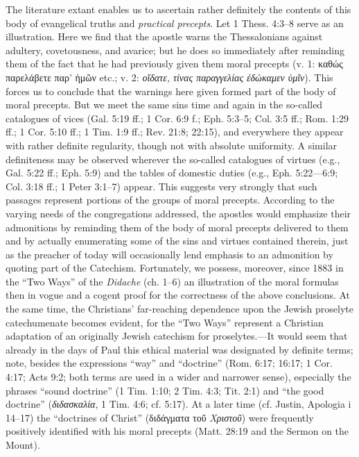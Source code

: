 The literature extant enables us to ascertain rather definitely the contents of this body of evangelical truths and \emph{practical precepts}. Let 1 Thess. 4:3–8 serve as an illustration. Here we find that the apostle warns the Thessalonians against adultery, covetousness, and avarice; but he does so immediately after reminding them of the fact that he had previously given them moral precepts (v. 1: καθώς παρελάβετε παρ’ ἡμῶν etc.;
v. 2: \emph{οἴδατε, τίνας παραγγελίας ἐδώκαμεν ὑμῖν}). This forces us to conclude that the warnings here given formed part of the body of moral precepts. But we meet the same sins time and again in the so-called catalogues of vices (Gal. 5:19 ff.; 1 Cor. 6:9 f.; Eph. 5:3–5; Col. 3:5 ff.; Rom. 1:29 ff.; 1 Cor. 5:10 ff.; 1 Tim. 1:9 ff.; Rev. 21:8; 22:15), and everywhere they appear with rather definite regularity, though not with absolute uniformity. A similar definiteness may be observed wherever the so-called catalogues of virtues (e.g., Gal. 5:22 ff.; Eph. 5:9) and the tables of domestic duties (e.g., Eph. 5:22—6:9; Col. 3:18 ff.; 1 Peter 3:1–7) appear. This suggests very strongly that such passages represent portions of the groups of moral precepts. According to the varying needs of the congregations addressed, the apostles would emphasize their admonitions by reminding them of the body of moral precepts delivered to them and by actually enumerating some of the sins and virtues contained therein, just as the preacher of today will occasionally lend emphasis to an admonition by quoting part of the Catechism. Fortunately, we possess, moreover, since 1883 in the “Two Ways” of the \emph{Didache} (ch. 1–6) an illustration of the moral formulas then in vogue and a cogent proof for the correctness of the above conclusions. At the same time, the Christians’ far-reaching dependence upon the Jewish proselyte catechumenate becomes evident, for the “Two Ways” represent a Christian adaptation of an originally Jewish catechism for proselytes.—It would seem that already in the days of Paul this ethical material was designated by definite terms; note, besides the expressions “way” and “doctrine” (Rom. 6:17; 16:17; 1 Cor. 4:17; Acts 9:2; both terms are used in a wider and narrower sense), especially the phrases “sound doctrine” (1 Tim. 1:10; 2 Tim. 4:3; Tit. 2:1) and “the good doctrine” (\emph{διδασκαλία}, 1 Tim. 4:6; cf. 5:17). At a later time (cf. Justin, Apologia i 14–17) the “doctrines of Christ” (διδάγματα τοῦ
\emph{Χριστοῦ}) were frequently positively identified with his moral precepts (Matt. 28:19 and the Sermon on the Mount).

